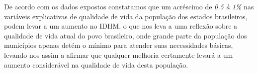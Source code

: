 \documentclass[journal]{IEEEtran}
\begin{document}
De acordo com os dados expostos constatamos que um acréscimo de \emph{0.5 à 1\%} nas variáveis explicativas de qualidade de vida da população dos estados brasileiros, podem levar a um aumento no IDHM, o que nos leva a uma reflexão sobre a qualidade de vida atual do povo brasileiro, onde grande parte da população dos municípios apenas detém o mínimo para atender suas necessidades básicas, levando-nos assim a afirmar que qualquer melhoria certamente levará a um aumento considerável na qualidade de vida desta população.

\ifCLASSOPTIONcaptionsoff
  \newpage
\fi



\end{document}
